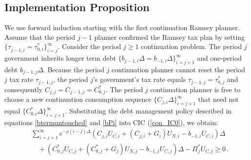 \documentclass[12pt]{article}
\newcommand{\NW}[1]{{\textcolor{blue}{#1}}}
\begin{document}





\subsection{Implementation Proposition} \label{sec:im_pro}

We use forward induction starting with the first continuation Ramsey planner. 
Assume that  the period $j-1$ planner confirmed the Ramsey tax plan {by setting $\{\tau_{j-1, i}^{}=\tau_{0, i}^*\}_{i= j}^\infty$}. Consider the  period $j\geq 1$ continuation problem.
The period $j$ government inherits longer term debt $\{b_{j-1, i}\Delta=b_{-1, i}\Delta\}_{i= j+1}^\infty$ {and one-period debt $b_{j-1, j}\Delta$}. %
Because the period $j$ continuation planner cannot reset the period $j$ tax rate $\tau_{j-1, j}$,   the period $j$'s government's tax rate equals %
$\tau_{j-1, j} =\tau_{0, j}^*$ and consequently $ C_{j, {j}}=C_{j-1, {j}}=C_{0, j}^*$.  The period $j$ continuation planner is free to  choose a new continuation  consumption sequence $\{C_{j, i}\Delta\}_{i=j+1}^\infty$ %
that need not equal  $\{C_{0, i}^\ast \Delta\}_{i=j+1}^\infty$.  %
Substituting  the debt management policy described in equations \eqref{btermuntouched} and \eqref{bPi}  into  %
{CIC} (\ref{con_IC0}), we obtain: 
\begin{align}\label{con_IC}
& \sum_{i=j+1}^{\infty} e^{-\rho(i-j) \Delta} \left(  C_{j, i}U_{C, i} + (C_{j, i}+G_{i})U_{N, i} -b_{-1, i} U_{C, i} \right) \Delta \nonumber\\
& \quad  + \left (C_{0, j}^*U_{C, j} + (C_{0, j}^*+G_{j})U_{N, j} - b_{-1,j} U_{C, j} \right)\Delta - \Pi_{{j}}^*U_{C, j}\geq 0\, .
\end{align} 
\end{document}
